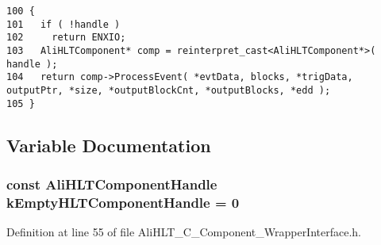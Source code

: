 \footnotesize\begin{verbatim}100 {
101   if ( !handle )
102     return ENXIO;
103   AliHLTComponent* comp = reinterpret_cast<AliHLTComponent*>( handle );
104   return comp->ProcessEvent( *evtData, blocks, *trigData, outputPtr, *size, *outputBlockCnt, *outputBlocks, *edd );
105 }
\end{verbatim}\normalsize 




\subsection{Variable Documentation}
\subsubsection{\setlength{\rightskip}{0pt plus 5cm}const {\bf Ali\-HLTComponent\-Handle} {\bf k\-Empty\-HLTComponent\-Handle} = 0}\label{group__alihlt__wrapper__interface_ga1}




Definition at line 55 of file Ali\-HLT\_\-C\_\-Component\_\-Wrapper\-Interface.h.